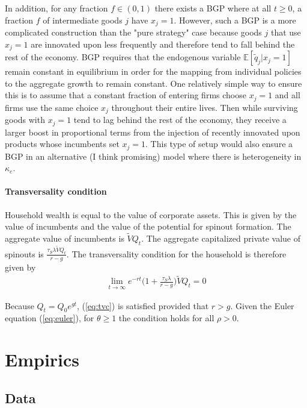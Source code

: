 \documentclass[11pt,english]{article}
\theoremstyle{remark}
\begin{document}
In addition, for any fraction $f \in (0,1)$ there exists a BGP where at all $t \ge 0$, a fraction $f$ of intermediate goods $j$ have $x_j = 1$. However, such a BGP is a more complicated construction than the "pure strategy" case because goods $j$ that use $x_j = 1$ are innovated upon less frequently and therefore tend to fall behind the rest of the economy. BGP requires that the endogenous variable $\mathbb{E}[\tilde{q}_j | x_j = 1]$ remain constant in equilibrium in order for the mapping from individual policies to the aggregate growth to remain constant. One relatively simple way to ensure this is to assume that a constant fraction of entering firms choose $x_j = 1$ and all firms use the same choice $x_j$ throughout their entire lives. Then while surviving goods with $x_j = 1$ tend to lag behind the rest of the economy, they receive a larger boost in proportional terms from the injection of recently innovated upon products whose incumbents set $x_j = 1$. This type of setup would also ensure a BGP in an alternative (I think promising) model where there is heterogeneity in $\kappa_e$. 

\paragraph{Transversality condition}

Household wealth is equal to the value of corporate assets. This is given by the value of incumbents and the value of the potential for spinout formation. The aggregate value of incumbents is $\tilde{V}Q_t$. The aggregate capitalized private value of spinouts is $\frac{\tau_S \lambda \tilde{V} Q_t}{r-g}$. The transversality condition for the household is therefore given by 
\begin{align}
	\lim_{t \to \infty} e^{-rt} \big(1 + \frac{\tau_S \lambda }{r-g}\big)\tilde{V} Q_t = 0 \label{eq:tvc}
\end{align}

Because $Q_t = Q_0 e^{gt}$, (\ref{eq:tvc}) is satisfied provided that $r > g$. Given the Euler equation (\ref{eq:euler}), for $\theta \ge 1$ the condition holds for all $\rho > 0$.  

\section{Empirics}

\subsection{Data}
\end{document}
